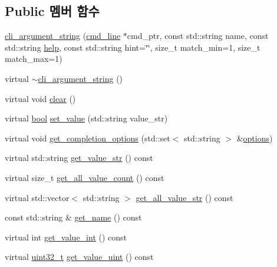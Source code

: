 \subsection*{Public 멤버 함수}
\begin{DoxyCompactItemize}
\item 
\hyperlink{classcli__argument__string_a92f5b45af48effe56fed7fa5434adfce}{cli\+\_\+argument\+\_\+string} (\hyperlink{classcmd__line}{cmd\+\_\+line} $\ast$cmd\+\_\+ptr, const std\+::string name, const std\+::string \hyperlink{simple__rx_8c_ad8c51bbfda76f19f61c727838e6eee30}{help}, const std\+::string hint=\char`\"{}\char`\"{}, size\+\_\+t match\+\_\+min=1, size\+\_\+t match\+\_\+max=1)
\item 
virtual \hyperlink{classcli__argument__string_a8223534452a0c2568d371276079a628f}{$\sim$cli\+\_\+argument\+\_\+string} ()
\item 
virtual void \hyperlink{classcli__argument__string_ac8bb3912a3ce86b15842e79d0b421204}{clear} ()
\item 
virtual \hyperlink{avb__gptp_8h_af6a258d8f3ee5206d682d799316314b1}{bool} \hyperlink{classcli__argument__string_aa768ad337cc685b348672423139875a4}{set\+\_\+value} (std\+::string value\+\_\+str)
\item 
virtual void \hyperlink{classcli__argument__string_a352166cf0e4c52574c7ca484bbcc44ed}{get\+\_\+completion\+\_\+options} (std\+::set$<$ std\+::string $>$ \&\hyperlink{aaf-talker_8c_abc1fd3a47aea6a8944038c9100eb9135}{options})
\item 
virtual std\+::string \hyperlink{classcli__argument__string_a30924e54bc1df74cadc22e90d43c0124}{get\+\_\+value\+\_\+str} () const 
\item 
virtual size\+\_\+t \hyperlink{classcli__argument__string_ac6f27f29a2c1249e0c49cc9064ee75ad}{get\+\_\+all\+\_\+value\+\_\+count} () const 
\item 
virtual std\+::vector$<$ std\+::string $>$ \hyperlink{classcli__argument__string_a3db4f59a61184261b69eb347d37ee066}{get\+\_\+all\+\_\+value\+\_\+str} () const 
\item 
const std\+::string \& \hyperlink{classcli__argument_a5d21f54a56044f0fd7b2d9bb0474ba33}{get\+\_\+name} () const 
\item 
virtual int \hyperlink{classcli__argument_a70de7682629678e3139c0511910036c1}{get\+\_\+value\+\_\+int} () const 
\item 
virtual \hyperlink{parse_8c_a6eb1e68cc391dd753bc8ce896dbb8315}{uint32\+\_\+t} \hyperlink{classcli__argument_a5f9326ccc460c0477c9ec2a3c6fe8e2b}{get\+\_\+value\+\_\+uint} () const 

\end{DoxyCompactItemize}
